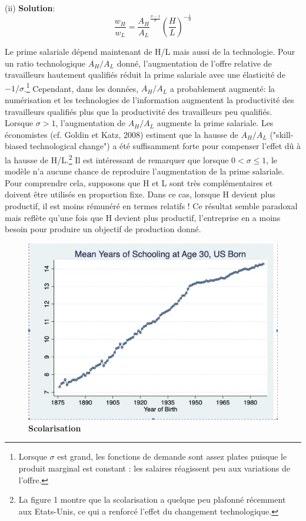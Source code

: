 \documentclass[11pt,a4paper]{article}
\begin{document}
\bigskip
(ii) \textbf{Solution}:  \begin{equation}\label{due}
    \frac{w_H}{w_L} = \frac{A_H}{A_L}^{\frac{\sigma -1}{\sigma}} (\frac{H}{L})^{-\frac{1} {\sigma}}
\end{equation}

Le prime salariale dépend maintenant de H/L mais aussi de la  technologie.  Pour un ratio technologique $A_H/A_L$ donné, l'augmentation de l'offre relative de travailleurs hautement qualifiés réduit la prime salariale avec une élasticité de $-1/\sigma$.\footnote{Lorsque $\sigma$ est  grand, les fonctions de demande sont assez plates puisque le produit marginal est constant : les salaires réagissent peu aux variations de l'offre.} Cependant,  dans les données, $A_H/A_L$ a probablement augmenté: la numérisation et les technologies de l'information augmentent la productivité des travailleurs qualifiés plus que la productivité des travailleurs peu qualifiés. Lorsque $\sigma>1$, l'augmentation de
$A_H/A_L$ augmente la prime salariale. Les économistes (cf. Goldin et Katz, 2008) estiment que la hausse de $A_H/A_L$ ("skill-biased technological change") a été suffisamment forte pour compenser l'effet dû à la hausse de H/L.\footnote{La figure 1 montre que la scolarisation a quelque peu plafonné récemment aux Etats-Unis, ce qui a renforcé l'effet du changement technologique.} Il est intéressant de remarquer que lorsque $0<\sigma \leq 1$, le modèle n'a aucune chance de reproduire l'augmentation de la prime salariale. Pour comprendre cela, supposons que H et L sont très complémentaires et doivent être utilisés en proportion fixe. Dans ce cas, lorsque H devient plus productif, il est moins rémunéré en termes relatifs ! Ce résultat semble paradoxal mais reflète qu'une fois que H devient plus productif, l'entreprise en a moins besoin pour produire un objectif de production donné. 
\begin{figure}[th]
\centering
\includegraphics[keepaspectratio=true, scale=0.3, clip = true]{PLAT.png}
\caption{\textbf{Scolarisation}}
\label{fig:1.4}
\end{figure}
 
\end{document}
